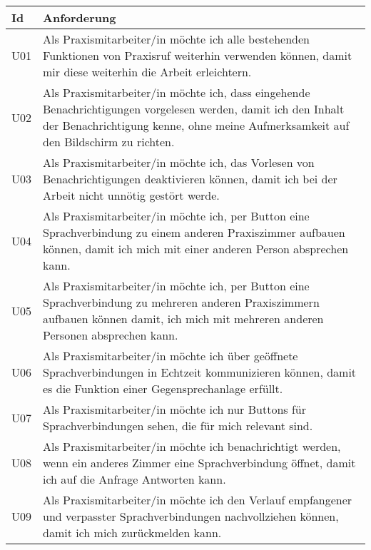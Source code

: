 \begin{table}[h]
    \centering
    \begin{tabular}{|l|p{15cm}|}
        \hline
        \textbf{Id} & \textbf{Anforderung}                                                                                                                                                                                      \\
        \hline
        U01 & Als Praxismitarbeiter/in möchte ich alle bestehenden Funktionen von Praxisruf weiterhin verwenden können, damit mir diese weiterhin die Arbeit erleichtern. \\
        \hline
        U02 & Als Praxismitarbeiter/in möchte ich, dass eingehende Benachrichtigungen vorgelesen werden, damit ich den Inhalt der Benachrichtigung kenne, ohne meine Aufmerksamkeit auf den Bildschirm zu richten. \\
        \hline
        U03 & Als Praxismitarbeiter/in möchte ich, das Vorlesen von Benachrichtigungen deaktivieren können, damit ich bei der Arbeit nicht unnötig gestört werde.                                                       \\
        \hline
        U04 & Als Praxismitarbeiter/in möchte ich, per Button eine Sprachverbindung zu einem anderen Praxiszimmer aufbauen können, damit ich mich mit einer anderen Person absprechen kann.                             \\
        \hline
        U05 & Als Praxismitarbeiter/in möchte ich, per Button eine Sprachverbindung zu mehreren anderen Praxiszimmern aufbauen können damit, ich mich mit mehreren anderen Personen absprechen kann. \\
        \hline
        U06 & Als Praxismitarbeiter/in möchte ich über geöffnete Sprachverbindungen in Echtzeit kommunizieren können, damit es die Funktion einer Gegensprechanlage erfüllt.                 \\
        \hline
        U07 & Als Praxismitarbeiter/in möchte ich nur Buttons für Sprachverbindungen sehen, die für mich relevant sind.                                                                              \\
        \hline
        U08 & Als Praxismitarbeiter/in möchte ich benachrichtigt werden, wenn ein anderes Zimmer eine Sprachverbindung öffnet, damit ich auf die Anfrage Antworten kann.                             \\
        \hline
        U09 & Als Praxismitarbeiter/in möchte ich den Verlauf empfangener und verpasster Sprachverbindungen nachvollziehen können, damit ich mich zurückmelden kann.                                               \\

\end{tabular}
\end{table}
